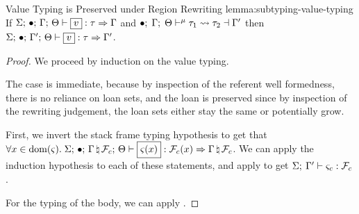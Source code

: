 \begin{oxlemma}{Value Typing is Preserved under Region Rewriting}
  {lemma:subtyping-value-typing} If
  $\oxtypjudge{\oxglobalctx}{\oxemptyctx}{\oxkontctx}{\oxvarctx}
  {\oxvalue}{\oxtype}{\oxvarctx}$ and
  $\bullet; \; \Gamma; \; \Theta \vdash^{\mu} \tau_1 \leadsto \tau_2 \dashv \Gamma^\prime$
  then $\oxtypjudge{\oxglobalctx}{\oxemptyctx}{\oxkontctx}{\oxvarctx^\prime}
  {\oxvalue}{\oxtype}{\oxvarctx^\prime}$.
\end{oxlemma}

\begin{proof}
  We proceed by induction on the value typing.

  \vspace{1em}
  \noindent \framebox[\textwidth]{ \figuresize
    \begin{mathpar}
      \inferrule[T-Pointer]{
        \oxreferentvalidity{\oxglobalctx}{\oxvarctx}{\oxreferentctx[\oxplace]}{\oxxitype} \\
        \oxloanpkg{\oxmuta}{\oxplace} \in \oxvarctx(\oxcprov) \\
      }{
        \oxtypjudge{\oxglobalctx}{\oxemptyctx}{\oxkontctx}{\oxvarctx}{
          \oxptr{\oxreferentctx[\oxplace]} }{
          \oxtref{\oxcprov}{\oxmuta}{\oxxitype} }{\oxvarctx} }
    \end{mathpar}
  } \vspace{1em}

  The  case is immediate, because by inspection of the
  referent well formedness, there is no reliance on loan sets, and the loan is
  preserved since by inspection of the rewriting judgement, the loan sets either
  stay the same or potentially grow.
  
  \vspace{1em}
  \noindent \framebox[\textwidth]{ \figuresize
    \begin{mathpar}
      \TClosureVal
    \end{mathpar}
  } \vspace{1em}

  First, we invert the stack frame typing hypothesis to get that $\forall \oxid
  \in \oxdomain{\oxstackframe}.\;
  \oxtypjudge{\oxglobalctx}{\oxemptyctx}{\oxkontctx}{\oxnewframe{\oxvarctx}{\oxframe_c}}{\oxstackframe(\oxid)}{\oxframe_c(\oxid)}{\oxnewframe{\oxvarctx}{\oxframe_c}}$.
  We can apply the induction hypothesis to each of these statements, and apply
   to get
  $\Sigma; \: \Gamma^\prime \vdash \varsigma_c : \mathcal{F}_c$.

  For the typing of the body, we can apply .
\end{proof}

